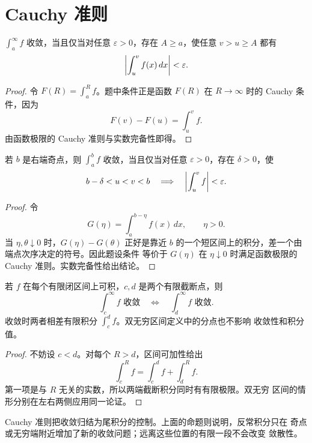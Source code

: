 \section{Cauchy 准则}

\begin{theorem}
\label{thm:improper-cauchy-infinity}
\(\int_a^\infty f\) 收敛，当且仅当对任意 \(\varepsilon>0\)，存在
\(A\ge a\)，使任意 \(v>u\ge A\) 都有
\[
 \left|\int_u^v f(x)\,dx\right|<\varepsilon.
\]
\end{theorem}

\begin{proof}
令 \(F(R)=\int_a^R f\)。题中条件正是函数 \(F(R)\) 在
\(R\to\infty\) 时的 Cauchy 条件，因为
\[
 F(v)-F(u)=\int_u^v f.
\]
由函数极限的 Cauchy 准则与实数完备性即得。
\end{proof}

\begin{theorem}
若 \(b\) 是右端奇点，则 \(\int_a^b f\) 收敛，当且仅当对任意
\(\varepsilon>0\)，存在 \(\delta>0\)，使
\[
 b-\delta<u<v<b
 \quad\Longrightarrow\quad
 \left|\int_u^v f\right|<\varepsilon.
\]
\end{theorem}

\begin{proof}
令
\[
 G(\eta)=\int_a^{b-\eta}f(x)\,dx,\qquad \eta>0.
\]
当 \(\eta,\theta\downarrow0\) 时，\(G(\eta)-G(\theta)\) 正好是靠近
\(b\) 的一个短区间上的积分，差一个由端点次序决定的符号。因此题设条件
等价于 \(G(\eta)\) 在 \(\eta\downarrow0\) 时满足函数极限的 Cauchy
准则。实数完备性给出结论。
\end{proof}

\begin{proposition}[截断点的无关性]
\label{prop:improper-splitting-point}
若 \(f\) 在每个有限闭区间上可积，\(c,d\) 是两个有限截断点，则
\[
 \int_c^\infty f\text{ 收敛}
 \quad\Longleftrightarrow\quad
 \int_d^\infty f\text{ 收敛}.
\]
收敛时两者相差有限积分 \(\int_c^d f\)。双无穷区间定义中的分点也不影响
收敛性和积分值。
\end{proposition}

\begin{proof}
不妨设 \(c<d\)。对每个 \(R>d\)，区间可加性给出
\[
 \int_c^R f=\int_c^d f+\int_d^R f.
\]
第一项是与 \(R\) 无关的实数，所以两端截断积分同时有有限极限。双无穷
区间的情形分别在左右两侧应用同一论证。
\end{proof}

Cauchy 准则把收敛归结为尾积分的控制。上面的命题则说明，反常积分只在
奇点或无穷端附近增加了新的收敛问题；远离这些位置的有限一段不会改变
敛散性。

